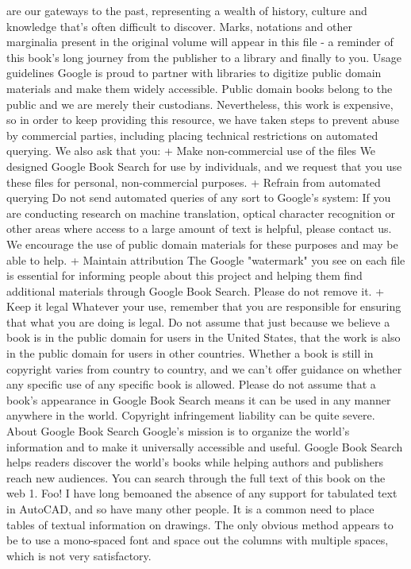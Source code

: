\documentclass[a4paper]{article}
\begin{document}
are our gateways to the past, representing a wealth of history, culture and knowledge that's often difficult to discover. 
Marks, notations and other marginalia present in the original volume will appear in this file - a reminder of this book's long journey from the 
publisher to a library and finally to you. 
Usage guidelines 
Google is proud to partner with libraries to digitize public domain materials and make them widely accessible. Public domain books belong to the 
public and we are merely their custodians. Nevertheless, this work is expensive, so in order to keep providing this resource, we have taken steps to 
prevent abuse by commercial parties, including placing technical restrictions on automated querying. 
We also ask that you: 
+ Make non-commercial use of the files We designed Google Book Search for use by individuals, and we request that you use these files for 
personal, non-commercial purposes. 
+ Refrain from automated querying Do not send automated queries of any sort to Google's system: If you are conducting research on machine 
translation, optical character recognition or other areas where access to a large amount of text is helpful, please contact us. We encourage the 
use of public domain materials for these purposes and may be able to help. 
+ Maintain attribution The Google "watermark" you see on each file is essential for informing people about this project and helping them find 
additional materials through Google Book Search. Please do not remove it. 
+ Keep it legal Whatever your use, remember that you are responsible for ensuring that what you are doing is legal. Do not assume that just 
because we believe a book is in the public domain for users in the United States, that the work is also in the public domain for users in other 
countries. Whether a book is still in copyright varies from country to country, and we can't offer guidance on whether any specific use of 
any specific book is allowed. Please do not assume that a book's appearance in Google Book Search means it can be used in any manner 
anywhere in the world. Copyright infringement liability can be quite severe. 
About Google Book Search 
Google's mission is to organize the world's information and to make it universally accessible and useful. Google Book Search helps readers 
discover the world's books while helping authors and publishers reach new audiences. You can search through the full text of this book on the web 1. Foo! I have long bemoaned the absence of any support for tabulated text in AutoCAD, and so have many other people. It is a common need to place tables of textual information on drawings. The only obvious method appears to be to use a mono-spaced font and space out the columns with multiple spaces, which is not very satisfactory.
\end{document}
